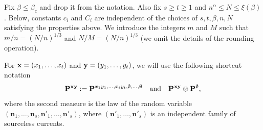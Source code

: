\documentclass[a4paper,oneside,11pt]{article}
\newcommand{\be}[1]{\begin{equation}\label{#1}}
\newcommand{\ee}{\end{equation}}
\numberwithin{equation}{section}
\numberwithin{equation}{section}
\numberwithin{equation}{section}
\def\be{\begin{equation}}
\def\ee{\end{equation}}
\newcommand{\n}{\mathbf{n}}
\begin{document}
Fix $\beta\le\beta_c$ and drop it from the notation. Also fix $s\ge  t\ge 
1$ and $n^\alpha\le N\le\xi(\beta)$. Below, constants $c_i$ and $C_i$ are independent of the choices of $s,t,
\beta,n,N$ satisfying the properties above. We introduce the integers $m$ and $M$ such that $m/n=(N/n)^{1/3}$ and $N/M=(N/n)^{1/3}$ (we omit the details of the rounding operation).

For ${\bf x}=(x_1,\dots,x_t)$ and ${\bf y}=(y_1,\dots,y_t)$, we will use the following shortcut notation 
\be
{\bf P}^{\bf xy}:={\bf P}^{x_1y_1,\dots,x_ty_t,\emptyset,\dots,\emptyset}\quad\text{and}\quad{\bf P}^{{\bf xy}}\otimes{\bf P}^\emptyset,
\ee
 where the second measure is the law of the random variable $(\n_1,\dots,\n_s,\n'_1,\dots,\n'_s)$, where  $(\n'_1,\dots,\n'_s)$ is an independent family of sourceless currents. 
\end{document}
